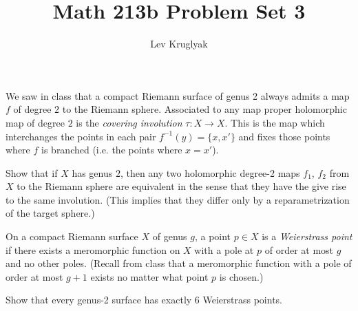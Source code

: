 \documentclass[expanded]{lkx_pset}
\title{Math 213b Problem Set 3}
\author{Lev Kruglyak}
\begin{document}
\maketitle

\begin{problem}{1}
We saw  in class that a compact Riemann surface of
genus 2 always admits a map $f$ of degree $2$ to the Riemann sphere.
Associated to any map proper holomorphic map of degree $2$ is the
\emph{covering involution} $\tau: X\to X$. This is the map which
interchanges the points in each pair $f^{-1}(y)=\{x, x'\}$ and fixes those
points where $f$ is branched (i.e. the points where $x=x'$).

\end{problem}

\begin{parts}
	\begin{part}{}
		Show that if $X$ has genus $2$, then any two holomorphic degree-2 maps $f_{1}$,
		$f_{2}$ from $X$ to the Riemann sphere are equivalent in the sense
		that they have the give rise to the same involution. (This implies
		that they differ only by a reparametrization of the target sphere.)
	\end{part}
\end{parts}

\begin{problem}{2}
On a compact Riemann surface  $X$ of genus $g$, a point $p\in X$ is a
\emph{Weierstrass point} if there exists a meromorphic function on
$X$ with a pole at $p$ of order at most $g$ and no other poles.
(Recall from class that a meromorphic function with a pole of order
at most $g+1$ exists no matter what point $p$ is chosen.)

\end{problem}

\begin{parts}
	\begin{part}{}
		Show that every genus-2 surface has exactly $6$ Weierstrass points.
	\end{part}
\end{parts}
\end{document}
